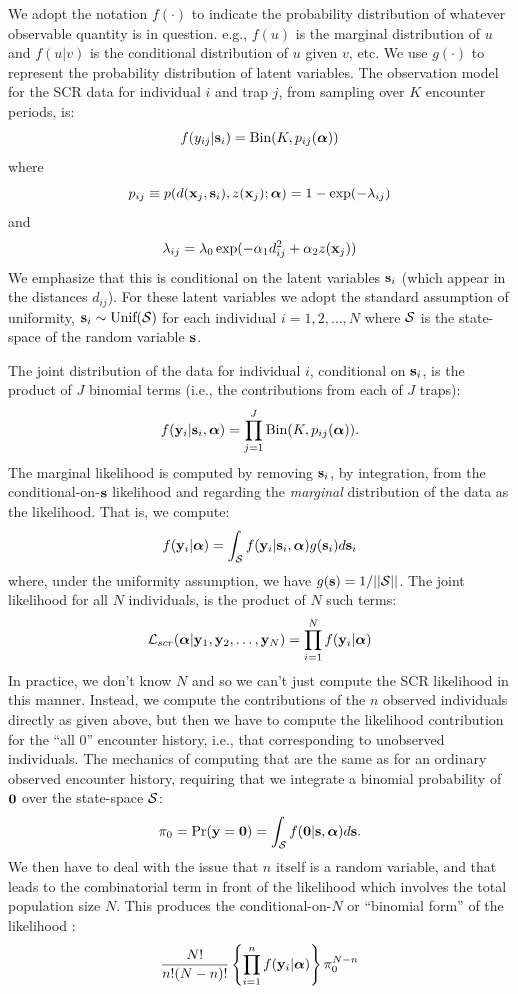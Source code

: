 \documentclass[12pt]{article}
\begin{document}
We adopt the notation $f(\cdot)$ to indicate the probability
distribution of whatever observable quantity is in question. e.g., $f(u)$ is
the marginal distribution of $u$ and $f(u|v)$ is the conditional
distribution of $u$ given $v$, etc. We use $g(\cdot)$ to represent the
probability distribution of latent variables.
The observation model for the SCR data for individual $i$ and trap $j$,
from sampling over $K$ encounter periods, is:
\begin{equation}
f(y_{ij}| {\bf s}_{i}) = \mbox{Bin}(K, p_{ij}({\bm \alpha}))
\label{rsf.mle.eq.cond-on-s}
\end{equation}
where
\[
p_{ij} \equiv  p(d({\bf x}_{j},{\bf s}_{i}), z({\bf x}_{j}); {\bm \alpha})
 = 1-\exp(- \lambda_{ij} )
\]
and
\[
 \lambda_{ij} = \lambda_{0} \exp(- \alpha_{1} d_{ij}^{2} + \alpha_{2}
 z({\bf x}_{j}) )
\]
We emphasize that this is conditional on the latent variables ${\bf
  s}_{i}$ (which appear in the distances $d_{ij}$). For these latent variables we
adopt the standard assumption of uniformity, ${\bf s}_{i} \sim
\mbox{Unif}({\cal S})$ for each individual $i=1,2,\ldots,N$
\citep{royle_young:2008} where ${\cal S}$ is the state-space of the
random variable ${\bf s}$.

The joint distribution of the data for
individual $i$, conditional on ${\bf s}_{i}$, is the product of $J$
binomial terms (i.e., the contributions from each of $J$ traps):
\[
  f({\bf y}_{i} | {\bf s}_{i} , {\bm \alpha}) =
  \prod_{j=1}^{J} \mbox{Bin}(K, p_{ij} ( {\bm \alpha})).
\]
The marginal likelihood \citep{borchers_efford:2008} is
computed by removing ${\bf s}_{i}$, by integration, from the
conditional-on-${\bf s}$ likelihood and regarding the {\it marginal}
distribution of the data as the likelihood. That is, we compute:
\[
  f({\bf y}_{i}|{\bm \alpha}) =
\int_{{\cal S}}  f( {\bf y}_{i} |{\bf s}_{i},{\bm \alpha}) g({\bf s}_{i}) d{\bf s}_{i}
\]
 where, under the uniformity assumption, we have
$g({\bf s}) = 1/||{\cal S}||$.
The joint likelihood for all $N$ individuals,
is the product of $N$ such terms:
\[
{\cal L}_{scr}({\bm \alpha} | {\bf y}_{1},{\bf y}_{2},\ldots, {\bf y}_{N}) = \prod_{i=1}^{N}
f({\bf y}_{i}|{\bm \alpha})
\]
In practice, we don't know $N$ and so we can't just compute the SCR
likelihood in this manner. Instead, we compute the contributions of
the $n$ observed individuals directly as given above, but then we have
to compute the likelihood contribution for the ``all 0'' encounter
history, i.e., that corresponding to unobserved individuals.  The
mechanics of computing that are the same as for an ordinary observed
encounter history, requiring that we integrate a binomial probability
of ${\bf 0}$ over the state-space ${\cal S}$:
\[
\pi_{0} = \Pr({\bf y} = {\bf 0}) = \int_{{\cal S}}
  f({\bf 0} | {\bf s} , {\bm \alpha})  d{\bf s}.
\]
We
then have to deal with the issue that $n$ itself is a random variable,
and that leads to the combinatorial term in front of the likelihood
which involves the total population size $N$. This produces the
conditional-on-$N$ or ``binomial form'' of the likelihood
\citep{borchers_efford:2008,royle:2009}:
\[
\frac{N!}{n! (N-n)!}
\left\{ \prod_{i=1}^{n} f({\bf y}_{i}|{\bm \alpha}) \right\}
\pi_{0}^{N-n}
\]
\end{document}
